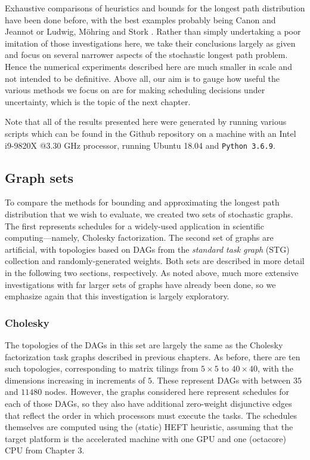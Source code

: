 \documentclass[12pt]{article}
\begin{document}
Exhaustive comparisons of heuristics and bounds for the longest path distribution have been done before, with the best examples probably being Canon and Jeannot \cite{can16} or Ludwig, M{\"o}hring and Stork \cite{lud01}. Rather than simply undertaking a poor imitation of those investigations here, we take their conclusions largely as given and focus on several narrower aspects of the stochastic longest path problem. Hence the numerical experiments described here are much smaller in scale and not intended to be definitive. Above all, our aim is to gauge how useful the various methods we focus on are for making scheduling decisions under uncertainty, which is the topic of the next chapter.

Note that all of the results presented here were generated by running various scripts which can be found in the Github repository on a machine with an Intel i9-9820X @3.30 GHz processor, running Ubuntu 18.04 and {\tt Python 3.6.9}. 

\subsection{Graph sets}
\label{subsect.graphs}

To compare the methods for bounding and approximating the longest path distribution that we wish to evaluate, we created two sets of stochastic graphs. The first represents schedules for a widely-used application in scientific computing---namely, Cholesky factorization. The second set of graphs are artificial, with topologies based on DAGs from the {\em standard task graph} (STG) collection \cite{tob02} and randomly-generated weights. Both sets are described in more detail in the following two sections, respectively. As noted above, much more extensive investigations with far larger sets of graphs have already been done, so we emphasize again that this investigation is largely exploratory.

\subsubsection{Cholesky}
\label{subsubsect.cholesky}

The topologies of the DAGs in this set are largely the same as the Cholesky factorization task graphs described in previous chapters. As before, there are ten such topologies, corresponding to matrix tilings from $5 \times 5$ to $40 \times 40$, with the dimensions increasing in increments of $5$. These represent DAGs with between $35$ and $11480$ nodes. However, the graphs considered here represent schedules for each of those DAGs, so they also have additional zero-weight disjunctive edges that reflect the order in which processors must execute the tasks. The schedules themselves are computed using the (static) HEFT heuristic, assuming that the target platform is the accelerated machine with one GPU and one (octacore) CPU from Chapter 3.
\end{document}
